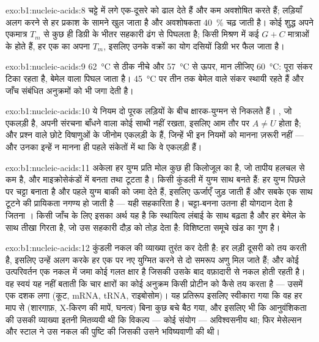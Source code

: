 \begin{solution}{exo:b1:nucleic-acids:8}
चट्टे में लगे  एक-दूसरे को ढाल देते हैं और कम अवशोषित करते हैं;
लड़ियाँ अलग करने से हर  प्रकाश के सामने खुल जाता है और अवशोषकता
\qty{40}{\%} चढ़ जाती है। कोई शुद्ध  अपने एकमात्र $T_m$ से कुछ ही
डिग्री के भीतर सहकारी ढंग से पिघलता है; किसी मिश्रण में कई $G + C$
मात्राओं के  होते हैं, हर एक का अपना $T_m$, इसलिए उनके वक्रों का योग
दसियों डिग्री भर फैल जाता है।
\end{solution}

\begin{solution}{exo:b1:nucleic-acids:9}
\qty{62}{\celsius} से ठीक नीचे और \qty{57}{\celsius} से ऊपर, मान लीजिए
\qty{60}{\celsius}: पूरा संकर टिका रहता है, बेमेल वाला
पिघल जाता है। \qty{45}{\celsius} पर तीन तक बेमेल वाले संकर
स्थायी रहते हैं और जाँच संबंधित अनुक्रमों को भी जगा देती है।
\end{solution}

\begin{solution}{exo:b1:nucleic-acids:10}
ये नियम दो पूरक लड़ियों के बीच क्षारक-युग्मन से निकलते हैं।
, जो एकलड़ी है, अपनी संरचना बाँधने वाला कोई साथी नहीं रखता, इसलिए आम
तौर पर $A \neq U$ होता है; और प्रश्न वाले छोटे विषाणुओं के जीनोम
एकलड़ी  के हैं, जिन्हें भी इन नियमों को मानना ज़रूरी नहीं ---
और उनका इन्हें न मानना ही पहले संकेतों में था कि वे
एकलड़ी हैं।
\end{solution}

\begin{solution}{exo:b1:nucleic-acids:11}
अकेला हर युग्म प्रति मोल कुछ ही किलोजूल का है, जो तापीय
हलचल से कम है, और माइक्रोसेकंडों में बनता तथा टूटता है। किसी कुंडली में
युग्म साथ बनते हैं: हर युग्म पिछले पर चट्टा बनाता है और पहले युग्म बाकी
को जमा देते हैं, इसलिए ऊर्जाएँ जुड़ जाती हैं और सबके एक साथ टूटने की
प्रायिकता नगण्य हो जाती है --- यही सहकारिता है। चट्टा-बनना उतना ही
योगदान देता है जितना । किसी जाँच के लिए इसका अर्थ यह है कि
स्थायित्व लंबाई के साथ बढ़ता है और हर बेमेल के साथ तीखा गिरता है, जो उस
सहकारी दौड़ को तोड़ देता है: विशिष्टता समूचे खंड का गुण है।
\end{solution}

\begin{solution}{exo:b1:nucleic-acids:12}
कुंडली नकल की व्याख्या तुरंत कर देती है: हर लड़ी दूसरी को तय करती है,
इसलिए उन्हें अलग करके हर एक पर नए  युग्मित करने से दो
समरूप अणु मिल जाते हैं; और कोई उत्परिवर्तन एक नकल में जमा कोई गलत क्षार
है जिसकी उसके बाद वफ़ादारी से नकल होती रहती है। वह स्वयं यह नहीं बताती कि
चार क्षारों का कोई अनुक्रम किसी प्रोटीन को कैसे तय करता है --- उसमें एक
दशक लगा (कूट, mRNA, tRNA, राइबोसोम)। यह प्रतिरूप इसलिए स्वीकारा गया कि वह
हर माप से (शारगाफ़, X-किरण की मापें, घनत्व) बिना कुछ बचे बैठ गया, और
इसलिए भी कि आनुवंशिकता की उसकी व्याख्या इतनी मितव्ययी थी कि विकल्प ---
कोई संयोग --- अविश्वसनीय था; फिर मेसेल्सन और स्टाल ने उस नकल की पुष्टि
की जिसकी उसने भविष्यवाणी की थी।
\end{solution}

